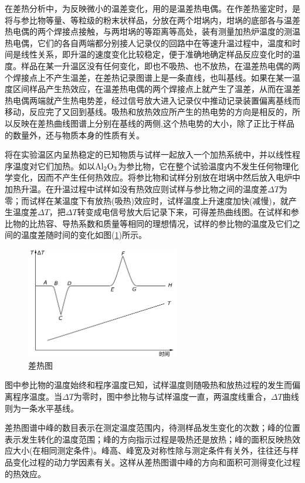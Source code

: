 \documentclass[a4paper]{article}
\begin{document}
在差热分析中，为反映微小的温差变化，用的是温差热电偶。在作差热鉴定时，是将与参比物等量、等粒级的粉末状样品，分放在两个坩埚内，坩埚的底部各与温差热电偶的两个焊接点接触，与两坩埚的等距离等高处，装有测量加热炉温度的测温热电偶，它们的各自两端都分别接人记录仪的回路中在等速升温过程中，温度和时间是线性关系，即升温的速度变化比较稳定，便于准确地确定样品反应变化时的温度。样品在某一升温区没有任何变化，即也不吸热、也不放热，在温差热电偶的两个焊接点上不产生温差，在差热记录图谱上是一条直线，也叫基线。如果在某一温度区间样品产生热效应，在温差热电偶的两个焊接点上就产生了温差，从而在温差热电偶两端就产生热电势差，经过信号放大进入记录仪中推动记录装置偏离基线而移动，反应完了又回到基线。吸热和放热效应所产生的热电势的方向是相反的，所以反映在差热曲线图谱上分别在基线的两侧,这个热电势的大小，除了正比于样品的数量外，还与物质本身的性质有关。

将在实验温区内呈热稳定的已知物质与试样一起放入一个加热系统中，并以线性程序温度对它们加热。如以$ \ce{Al_2O_3} $为参比物，它在整个试验温度内不发生任何物理化学变化，因而不产生任何热效应。将参比物和试样分别放在坩埚中然后放入电炉中加热升温。在升温过程中试样如没有热效应则试样与参比物之间的温度差$\Delta T$为零；而试样在某温度下有放热(吸热)效应时，试样温度上升速度加快(减慢)，就产生温度差$\Delta T$，把$\Delta T$转变成电信号放大后记录下来，可得差热曲线图。在试样和参比物的比热容、导热系数和质量等相同的理想情况，试样的参比物的温度及它们之间的温度差随时间的变化如图(\ref{fig1})所示。
\begin{figure}[!h]
\centering
\includegraphics[width=0.6\textwidth]{fig/fig1.pdf}
\caption{差热图}\label{fig1}
\end{figure}

图中参比物的温度始终和程序温度已知，试样温度则随吸热和放热过程的发生而偏离程序温度。当$\Delta T$为零时，图中参比物与试样温度一直，两温度线重合，$\Delta T$曲线则为一条水平基线。

差热图谱中峰的数目表示在测定温度范围内，待测样品发生变化的次数；峰的位置表示发生转化的温度范围；峰的方向指示过程是吸热还是放热；峰的面积反映热效应大小(在相同测定条件)。峰高、峰宽及对称性除与测定条件有关外，往往还与样品变化过程的动力学因素有关。这样从差热图谱中峰的方向和面积可测得变化过程的热效应。
\end{document}
